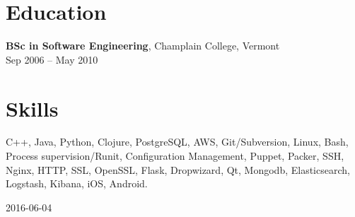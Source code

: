 \documentclass{article}
\newenvironment{bottompar}{\par\vspace*{\fill}}{\clearpage}
\begin{document}
\section*{Education}
{\bf BSc in Software Engineering}, Champlain College, Vermont\\
Sep 2006 -- May 2010\\

\section*{Skills}
C++, Java, Python, Clojure, PostgreSQL, AWS, Git/Subversion, Linux, Bash, Process supervision/Runit, Configuration Management, Puppet, Packer, SSH, Nginx, HTTP, SSL, OpenSSL, Flask, Dropwizard, Qt, Mongodb, Elasticsearch, Logstash, Kibana, iOS, Android.\\

\begin{bottompar}
\begin{center}
{\small 2016-06-04}
\end{center}
\end{bottompar}
\end{document}
